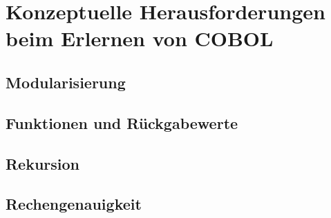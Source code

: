 \chapter{Konzeptuelle Herausforderungen beim Erlernen von COBOL}

\section{Modularisierung}

\section{Funktionen und Rückgabewerte}

\section{Rekursion}

\section{Rechengenauigkeit}